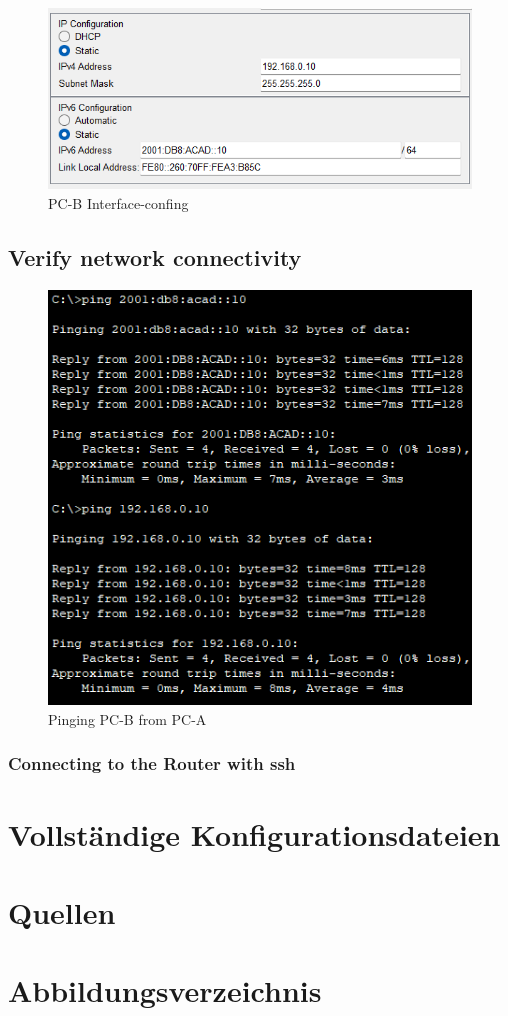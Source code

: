 \documentclass[a4paper]{article}
\begin{document}
\begin{figure}[h]
	\centering
	\includegraphics[scale=0.3]{images/pc-b-fa.png}
	\caption{PC-B Interface-confing}
\end{figure}

\subsection{Verify network connectivity}
\begin{figure}[h]
	\centering
	\includegraphics[scale=0.3]{images/ping.png}
	\caption{Pinging PC-B from PC-A}
\end{figure}
\subsubsection{Connecting to the Router with ssh}
\subsection{}
\section{Vollständige Konfigurationsdateien}

\newpage

\section{Quellen}

\newpage
\section{Abbildungsverzeichnis}

\listoffigures
\end{document}
